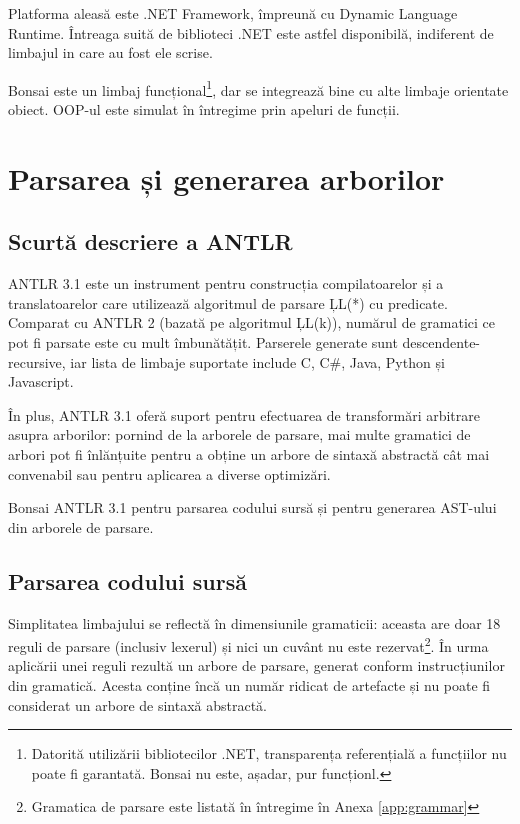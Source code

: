 \documentclass[12pt,a4paper]{memoir}
\begin{document}
Platforma aleasă este .NET Framework, împreună cu Dynamic Language Runtime. Întreaga suită de biblioteci .NET este astfel disponibilă, indiferent de limbajul in care au fost ele scrise. 

Bonsai este un limbaj funcțional\footnote{Datorită utilizării bibliotecilor .NET, transparența referențială a funcțiilor nu poate fi garantată. Bonsai nu este, așadar, pur funcționl.}, dar se integrează bine cu alte limbaje orientate obiect. OOP-ul este simulat în întregime prin apeluri de funcții.

\chapter{Parsarea și generarea arborilor}

\section{Scurtă descriere a ANTLR}

ANTLR 3.1\cite{antlr} este un instrument pentru construcția compilatoarelor și a translatoarelor care utilizează algoritmul de parsare \c{LL(*)} cu predicate\cite{definitive_antlr_reference}. Comparat cu ANTLR 2 (bazată pe algoritmul \c{LL(k)}), numărul de gramatici ce pot fi parsate este cu mult îmbunătățit. Parserele generate sunt descendente-recursive, iar lista de limbaje suportate\cite{antlr_targets} include C, C\#, Java, Python și Javascript.

În plus, ANTLR 3.1 oferă suport pentru efectuarea de transformări arbitrare asupra arborilor: pornind de la arborele de parsare, mai multe gramatici de arbori pot fi înlănțuite pentru a obține un arbore de sintaxă abstractă cât mai convenabil sau pentru aplicarea a diverse optimizări\cite{antlr_tree_grammars}.

Bonsai ANTLR 3.1 pentru parsarea codului sursă și pentru generarea AST-ului din arborele de parsare. 

\section{Parsarea codului sursă}

Simplitatea limbajului se reflectă în dimensiunile gramaticii: aceasta are doar 18 reguli de parsare (inclusiv lexerul) și nici un cuvânt nu este rezervat\footnote{Gramatica de parsare este listată în întregime în Anexa \ref{app:grammar}}. În urma aplicării unei reguli rezultă un arbore de parsare, generat conform instrucțiunilor din gramatică. Acesta conține încă un număr ridicat de artefacte și nu poate fi considerat un arbore de sintaxă abstractă.
\end{document}
